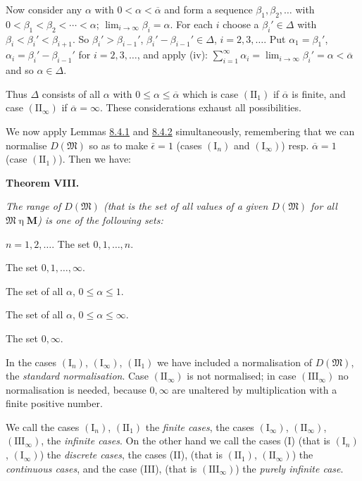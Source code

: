 \documentclass[12pt,b5paper,twoside]{article}
\newcommand{\M}{\mathbf M}
\newcommand{\MainTheorem}[1]{%
  \par\smallskip\noindent\phantomsection\label{thm:#1}\textbf{Theorem #1.}\enspace
}
\begin{document}
Now consider any $\alpha$ with $0<\alpha<\overline\alpha$ and form a sequence
$\beta_1,\beta_2,\ldots$ with
$0<\beta_1<\beta_2<\cdots<\alpha$;
$\lim_{i\to\infty}\beta_i=\alpha$. For each $i$ choose a
$\beta_i'\in\Delta$ with $\beta_i<\beta_i'<\beta_{i+1}$. So
$\beta_i'>\beta_{i-1}'$, $\beta_i'-\beta_{i-1}'\in\Delta$, $i=2,3,\ldots$.
Put $\alpha_1=\beta_1'$, $\alpha_i=\beta_i'-\beta_{i-1}'$ for
$i=2,3,\ldots$, and apply (iv):
$\sum_{i=1}^\infty\alpha_i=\lim_{i\to\infty}\beta_i'=\alpha
<\overline\alpha$ and so $\alpha\in\Delta$.

Thus $\Delta$ consists of all $\alpha$ with
$0\leq\alpha\leq\overline\alpha$ which is case $(\mathrm{II}_1)$ if
$\overline\alpha$ is finite, and case $(\mathrm{II}_\infty)$ if
$\overline\alpha=\infty$. These considerations exhaust all possibilities.

We now apply Lemmas \hyperref[lem:8.4.1]{8.4.1} and
\hyperref[lem:8.4.2]{8.4.2} simultaneously, remembering
that we can normalise $D(\mathfrak M)$ so as to make $\bar\epsilon=1$ (cases
$(\mathrm I_n)$ and $(\mathrm I_\infty)$) resp. $\overline\alpha=1$ (case
$(\mathrm{II}_1)$). Then we have:

\MainTheorem{VIII}
{\itshape
The range of $D(\mathfrak M)$ (that is the set of all values of a given
$D(\mathfrak M)$ for all $\mathfrak M\mathbin\eta\M$) is one of the following
sets:
\begin{description}[style=multiline,leftmargin=4.7em]
\item[$(\mathrm I_n)$] $n=1,2,\ldots$. The set $0,1,\ldots,n$.
\item[$(\mathrm I_\infty)$] The set $0,1,\ldots,\infty$.
\item[$(\mathrm{II}_1)$] The set of all $\alpha$, $0\leq\alpha\leq1$.
\item[$(\mathrm{II}_\infty)$] The set of all $\alpha$,
  $0\leq\alpha\leq\infty$.
\item[$(\mathrm{III}_\infty)$] The set $0,\infty$.
\end{description}}

In the cases $(\mathrm I_n)$, $(\mathrm I_\infty)$, $(\mathrm{II}_1)$ we have
included a normalisation of $D(\mathfrak M)$, the \emph{standard
normalisation}. Case $(\mathrm{II}_\infty)$ is not normalised; in case
$(\mathrm{III}_\infty)$ no normalisation is needed, because $0,\infty$ are
unaltered by multiplication with a finite positive number.

We call the cases $(\mathrm I_n)$, $(\mathrm{II}_1)$ the \emph{finite cases},
the cases $(\mathrm I_\infty)$, $(\mathrm{II}_\infty)$,
$(\mathrm{III}_\infty)$, the \emph{infinite cases}. On the other hand we call
the cases (I) (that is $(\mathrm I_n)$, $(\mathrm I_\infty)$) the
\emph{discrete cases}, the cases (II), (that is $(\mathrm{II}_1)$,
$(\mathrm{II}_\infty)$) the \emph{continuous cases}, and the case (III), (that
is $(\mathrm{III}_\infty)$) the \emph{purely infinite case}.
\end{document}
